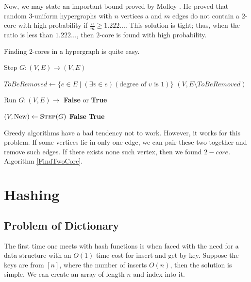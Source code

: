 Now, we may state an important bound proved by Molloy \cite{Molloy04}. He proved that random 3-uniform hypergraphs with $n$ vertices a and $m$ edges do not contain a $2$-core with high probability if $\frac{n}{m} \geq 1.222\dots$. This solution is tight; thus, when the ratio is less than $1.222\dots$, then $2$-core is found with high probability.

Finding $2$-cores in a hypergraph is quite easy.

\begin{algorithm}
\caption{Step $G : (V, E) \to (V, E)$}
\begin{algorithmic}[1]
    \State $ToBeRemoved \gets \{ e \in E \mid (\exists v \in e) (\text{degree of } v \text{ is } 1) \}$
    \State \Return $(V, E \setminus ToBeRemoved)$
\EndProcedure
\end{algorithmic}
\end{algorithm}

\begin{algorithm}
\caption{Run $G : (V, E) \to$ \textbf{False} or \textbf{True}}
\label{FindTwoCore}
\begin{algorithmic}[1]
    \State $(V, \text{New}) \gets \Call{Step}{G}$
        \State \Return \textbf{False}
    \EndIf
        \State \Return \textbf{True}
    \EndIf
    \State \Return {}
\EndProcedure
\end{algorithmic}
\end{algorithm}
Greedy algorithms have a bad tendency not to work. However, it works for this problem. If some vertices lie in only one edge, we can pair these two together and remove such edges. If there exists none such vertex, then we found $2-core$. Algorithm \ref{FindTwoCore}.

\section{Hashing}

\subsection{Problem of Dictionary}
The first time one meets with hash functions is when faced with the need for a data structure with an \(O(1)\) time cost for insert and get by key. Suppose the keys are from \([n]\), where the number of inserts \(O(n)\), then the solution is simple. We can create an array of length \(n\) and index into it. 

